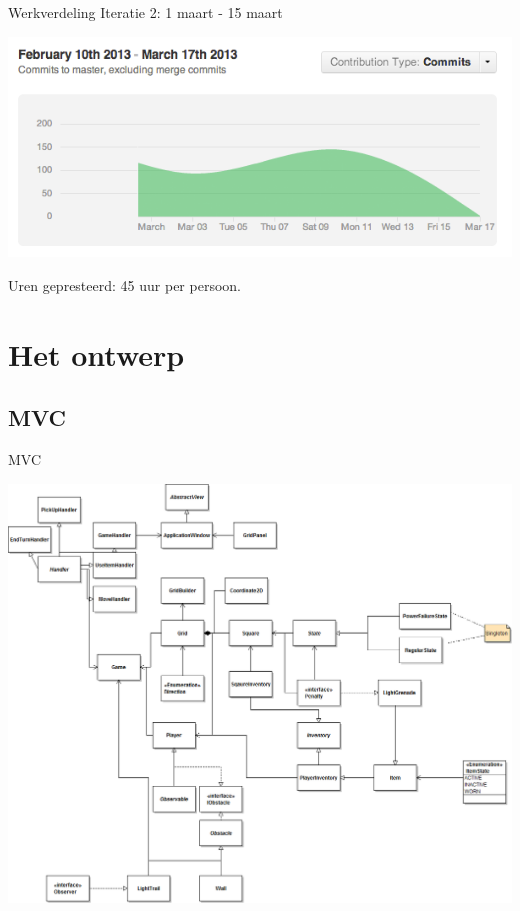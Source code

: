 \documentclass[t]{beamer}
\begin{document}
\begin{frame}{Werkverdeling}
Iteratie 2: 1 maart - 15 maart

\begin{center}
\includegraphics[width= 0.90\linewidth]{images/flowchart}
\end{center}

Uren gepresteerd: 45 uur per persoon.

\end{frame}
\section{Het ontwerp}
\subsection{MVC}

\begin{frame}{MVC}
\begin{center}
\includegraphics[width=0.70\linewidth]{images/MVC-overview}
\end{center}
\end{frame}
\end{document}

